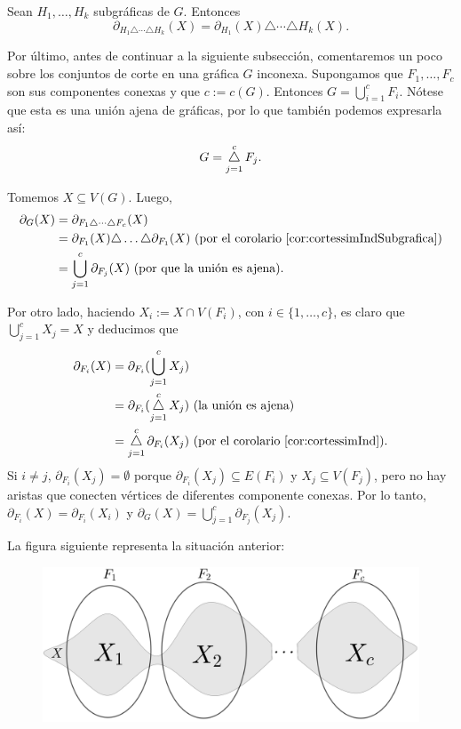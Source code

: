 \begin{cor}\label{cor:cortessimIndSubgrafica}
Sean $H_{1},\ldots, H_{k}$ subgráficas de $G$. Entonces $$\partial_{H_{1} \triangle \cdots \triangle H_{k}}(X) =\partial_{H_{1}}(X) \triangle \cdots \triangle H_{k}(X) .$$ 
\end{cor}


Por último, antes de continuar a la siguiente subsección, comentaremos un poco sobre los conjuntos de corte en una gráfica $G$ inconexa. Supongamos que $F_{1}, \ldots, F_{c}$ son sus componentes conexas y que $c:=c(G)$. Entonces $G = \bigcup_{i=1}^{c}F_{i}$. Nótese que esta es una unión ajena de gráficas, por lo que también podemos expresarla así:
$$G=\difsym_{j=1}^{c} F_{j}.$$

 Tomemos $X \subseteq V(G)$. Luego,
 \begin{align*}
   \partial_{G}(X) &= \partial_{F_{1} \triangle \cdots \triangle F_{c}}(X) \\
   &= \partial_{F_{1}}(X) \triangle \ldots \triangle \partial_{F_{1}}(X) \textnormal{ (por el corolario \ref{cor:cortessimIndSubgrafica})}\\
   &= \bigcup_{j=1}^{c}\partial_{F_{j}}(X) \textnormal{ (por que la unión es ajena).}
 \end{align*}
 
    Por otro lado, haciendo $X_{i}:=X \cap V(F_{i})$, con $i \in \{1, \ldots, c\}$, es claro que $\bigcup_{j=1}^{c}X_{j} = X$ y  deducimos que
    \begin{align*}
        \partial_{F_{i}}(X) &= \partial_{F_{i}}(\bigcup_{j=1}^{c}X_{j})\\
        &=\partial_{F_{i}}(\difsym_{j=1}^{c}X_{j}) \textnormal{ (la unión es ajena)}\\
        &= \difsym_{j=1}^{c} \partial_{F_{i}}(X_{j}) \textnormal{ (por el corolario \ref{cor:cortessimInd})}.
    \end{align*}
     Si $i \neq j$, $\partial_{F_{i}}(X_{j}) = \emptyset$ porque $\partial_{F_{i}}(X_{j}) \subseteq E(F_{i})$ y $X_{j} \subseteq V(F_{j})$, pero no hay aristas que conecten vértices de diferentes componente conexas. Por lo tanto, $\partial_{F_{i}}(X) = \partial_{F_{i}}(X_{i})$ y $\partial_{G}(X) = \bigcup_{j=1}^{c}\partial_{F_{j}}(X_{j})$.
    
    
    La figura siguiente representa la situación anterior:
 \begin{figure}[H]
    \centering
    \includegraphics[scale=0.15]{img/imgchapter2/componentes.jpg}
    \caption{}
    \label{fig:componentes}
\end{figure}

